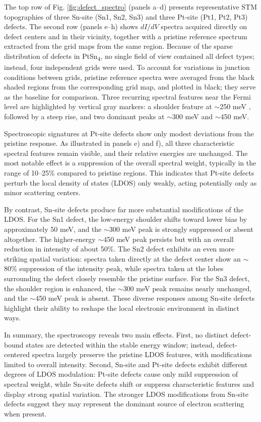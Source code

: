 The top row of Fig. \ref{fig:defect_spectro} (panels a–d) presents representative STM topographies of three Sn-site (Sn1, Sn2, Sn3) and three Pt-site (Pt1, Pt2, Pt3) defects. The second row (panels e–h) shows $dI/dV$ spectra acquired directly on defect centers and in their vicinity, together with a pristine reference spectrum extracted from the grid maps from the same region. Because of the sparse distribution of defects in PtSn\textsubscript{4}, no single field of view contained all defect types; instead, four independent grids were used. To account for variations in junction conditions between grids, pristine reference spectra were averaged from the black shaded regions from the corresponding grid map, and plotted in black; they serve as the baseline for comparison. Three recurring spectral features near the Fermi level are highlighted by vertical gray markers: a shoulder feature at $\sim$250 meV , followed by a steep rise, and two dominant peaks at $\sim$300 meV and $\sim$450 meV.

Spectroscopic signatures at Pt-site defects show only modest deviations from the pristine response. As illustrated in panels e) and f), all three characteristic spectral features remain visible, and their relative energies are unchanged. The most notable effect is a suppression of the overall spectral weight, typically in the range of 10–25\% compared to pristine regions. This indicates that Pt-site defects perturb the local density of states (LDOS) only weakly, acting potentially only as minor scattering centers.

By contrast, Sn-site defects produce far more substantial modifications of the LDOS. For the Sn1 defect, the low-energy shoulder shifts toward lower bias by approximately 50 meV, and the $\sim$300 meV peak is strongly suppressed or absent altogether. The higher-energy $\sim$450 meV peak persists but with an overall reduction in intensity of about 50\%. The Sn2 defect exhibits an even more striking spatial variation: spectra taken directly at the defect center show an $\sim$80\% suppression of the intensity peak, while spectra taken at the lobes surrounding the defect closely resemble the pristine surface. For the Sn3 defect, the shoulder region is enhanced, the $\sim$300 meV peak remains nearly unchanged, and the $\sim$450 meV peak is absent. These diverse responses among Sn-site defects highlight their ability to reshape the local electronic environment in distinct ways.

In summary, the spectroscopy reveals two main effects. First, no distinct defect-bound states are detected within the stable energy window; instead, defect-centered spectra largely preserve the pristine LDOS features, with modifications limited to overall intensity. Second, Sn-site and Pt-site defects exhibit different degrees of LDOS modulation: Pt-site defects cause only mild suppression of spectral weight, while Sn-site defects shift or suppress characteristic features and display strong spatial variation. The stronger LDOS modifications from Sn-site defects suggest they may represent the dominant source of electron scattering when present.

